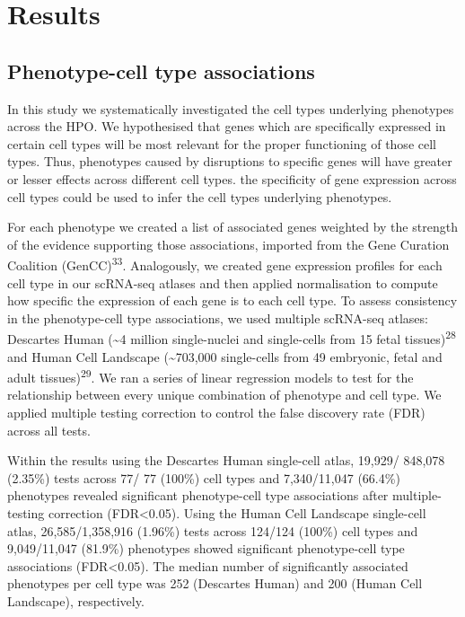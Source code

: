 \documentclass[
]{report}
\begin{document}
\section{Results}\label{sec-results}

\subsection{Phenotype-cell type
associations}\label{phenotype-cell-type-associations}

In this study we systematically investigated the cell types underlying
phenotypes across the HPO. We hypothesised that genes which are
specifically expressed in certain cell types will be most relevant for
the proper functioning of those cell types. Thus, phenotypes caused by
disruptions to specific genes will have greater or lesser effects across
different cell types. the specificity of gene expression across cell
types could be used to infer the cell types underlying phenotypes.

For each phenotype we created a list of associated genes weighted by the
strength of the evidence supporting those associations, imported from
the Gene Curation Coalition (GenCC)\textsuperscript{33}. Analogously, we
created gene expression profiles for each cell type in our scRNA-seq
atlases and then applied normalisation to compute how specific the
expression of each gene is to each cell type. To assess consistency in
the phenotype-cell type associations, we used multiple scRNA-seq
atlases: Descartes Human (\textasciitilde4 million single-nuclei and
single-cells from 15 fetal tissues)\textsuperscript{28} and Human Cell
Landscape (\textasciitilde703,000 single-cells from 49 embryonic, fetal
and adult tissues)\textsuperscript{29}. We ran a series of linear
regression models to test for the relationship between every unique
combination of phenotype and cell type. We applied multiple testing
correction to control the false discovery rate (FDR) across all tests.

Within the results using the Descartes Human single-cell atlas, 19,929/
848,078 (2.35\%) tests across 77/ 77 (100\%) cell types and 7,340/11,047
(66.4\%) phenotypes revealed significant phenotype-cell type
associations after multiple-testing correction (FDR\textless0.05). Using
the Human Cell Landscape single-cell atlas, 26,585/1,358,916 (1.96\%)
tests across 124/124 (100\%) cell types and 9,049/11,047 (81.9\%)
phenotypes showed significant phenotype-cell type associations
(FDR\textless0.05). The median number of significantly associated
phenotypes per cell type was 252 (Descartes Human) and 200 (Human Cell
Landscape), respectively.
\end{document}

